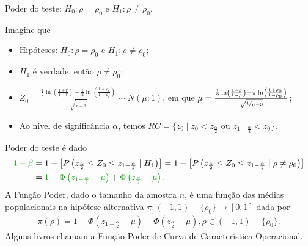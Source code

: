 \documentclass[9pt]{beamer}
\begin{document}
\begin{frame}{Poder do teste: $H_0:\rho = \rho_0$ e $H_1: \rho \neq \rho_0$.}

\normalsize

Imagine que
\begin{itemize}
	\item Hipóteses: $H_0:\rho = \rho_0$ e $H_1: \rho \neq \rho_0$;
	\item $H_1$ é verdade, então $\rho \neq \rho_0$;
	\item $Z_0 = \frac{\frac{1}{2} \ln\left( \frac{1 + r}{1 - r} \right) - \frac{1}{2} \ln\left( \frac{1 + \rho_0}{1 - \rho_0} \right)}{\sqrt{\frac{1}{n-3}}} \sim N\left( \mu; 1 \right)$, em que $\mu = \frac{ \frac{1}{2} \ln\left( \frac{1 + \rho}{1 - \rho} \right) -\frac{1}{2} \ln\left( \frac{1 + \rho_0}{1 - \rho_0} \right)  }{\sqrt{\nicefrac{1}{n-3}}}$;
	\item Ao nível de significância $\alpha$, temos $RC = \{ z_0 \mid z_0 < z_{\frac{\alpha}{2}} \mbox{ ou } z_{1-\frac{\alpha}{2}} < z_0  \}$.
\end{itemize}
\vfill	

Poder do teste é dado
\begin{align*}
\textcolor{important}{1-\beta} &=1 - \left[P\left( z_{\frac{\alpha}{2}} \leq Z_0 \leq z_{1-\frac{\alpha}{2}} \mid H_1 \right)\right] = 1 - \left[P\left( z_{\frac{\alpha}{2}} \leq Z_0 \leq z_{1-\frac{\alpha}{2}} \mid \rho \neq \rho_0 \right)\right]\\
&=\textcolor{important}{1 - \Phi\left( z_{1-\frac{\alpha}{2}} - \mu \right) + \Phi\left( z_{\frac{\alpha}{2}} - \mu \right).}
\end{align*}
A \textcolor{important}{Função Poder}, dado o tamanho da amostra $n$, é uma função das médias populacionais na hipótese alternativa  $\pi: (-1, 1) - \{\rho_0\} \longrightarrow [0,1]$ dada por
\begin{align*}
\pi(\rho) = 1 - \Phi\left( z_{1-\frac{\alpha}{2}} - \mu \right) + \Phi\left( z_{\frac{\alpha}{2}} - \mu \right), \rho \in (-1, 1) - \{\rho_0\}.
\end{align*}
Alguns livros chamam a Função Poder de \textcolor{important}{Curva de Característica Operacional.}

\normalsize

\end{frame}
\end{document}
